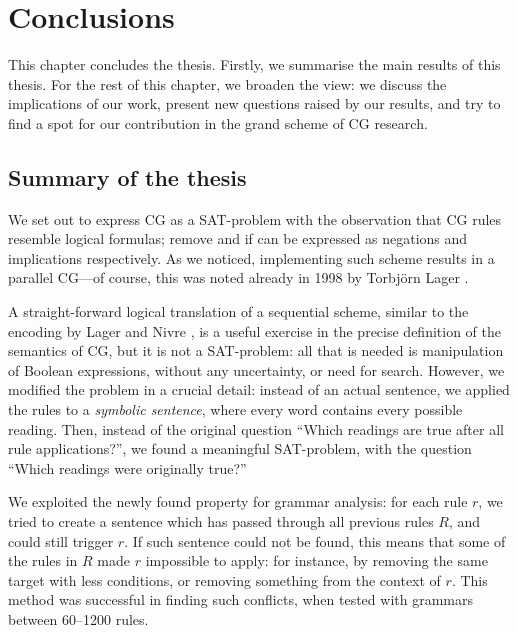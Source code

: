 \chapter{Conclusions}
\label{chapterConclusions}


This chapter concludes the thesis.
Firstly, we summarise the main results of this thesis.
For the rest of this chapter, we broaden the view: we discuss the implications of our work, 
present new questions raised by our results, and try to find a spot for our contribution 
in the grand scheme of CG research.

\section{Summary of the thesis}

We set out to express CG as a SAT-problem with the observation that CG rules resemble logical formulas; {\sc remove} and {\sc if} can be expressed as negations and implications respectively. As we noticed, implementing such scheme results in a parallel CG---of course, this was noted already in 1998 by Torbjörn Lager \cite{lager98}.

A straight-forward logical translation of a sequential scheme, similar to the encoding by Lager and Nivre \cite{lager_nivre01}, is a useful exercise in the precise definition of the semantics of CG, 
but it is not a SAT-problem: all that is needed is manipulation of Boolean expressions, 
without any uncertainty, or need for search. 
However, we modified the problem in a crucial detail: instead of an actual sentence, 
we applied the rules to a {\em symbolic sentence}, where every word contains every possible reading.
Then, instead of the original question ``Which readings are true after all rule applications?'', 
we found a meaningful SAT-problem, with the question ``Which readings were originally true?''

We exploited the newly found property for grammar analysis: 
for each rule $r$, we tried to create a sentence 
which has passed through all previous rules $R$, and could still trigger $r$.
If such sentence could not be found, this means that some of the rules in $R$ made $r$ impossible to apply: for instance, by removing the same target with less conditions, or removing something from the context of $r$.
This method was successful in finding such conflicts, when tested with grammars between 60--1200 rules.



